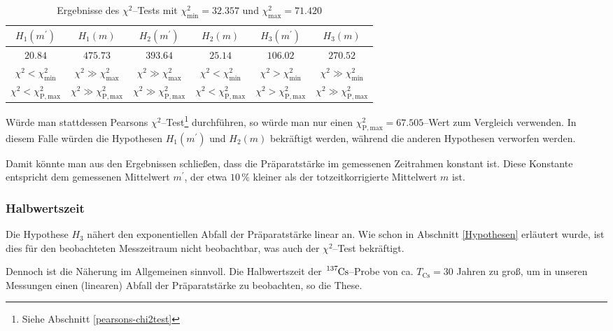 \documentclass[12pt,a4paper]{scrartcl}
\numberwithin{equation}{section} %
\renewcommand{\[}{} %
\renewcommand{\]}{\noindent} %
\begin{document}
\begin{table}[h]
	\centering
	\begin{tabular}{c|c|c|c|c|c}
		$H_1(m^\prime)$
			& $H_1(m)$
			& $H_2(m^\prime)$
			& $H_2(m)$
			& $H_3(m^\prime)$
			& $H_3(m)$
			\\
		\hline
		$20.84$
			& $475.73$
			& $393.64$
			& $25.14$
			& $106.02$
			& $270.52$
			\\
		$\chi^2 < \chi^2_\mathrm{min}$
			& $\chi^2 \gg \chi^2_\mathrm{max}$
			& $\chi^2 \gg \chi^2_\mathrm{max}$
			& $\chi^2 < \chi^2_\mathrm{min}$
			& $\chi^2 > \chi^2_\mathrm{min}$
			& $\chi^2 \gg \chi^2_\mathrm{min}$
			\\
		$\chi^2 < \chi_\mathrm{P, max}^2$
			& $\chi^2 \gg \chi_\mathrm{P, max}^2$
			& $\chi^2 \gg \chi_\mathrm{P, max}^2$
			& $\chi^2 < \chi_\mathrm{P, max}^2$
			& $\chi^2 > \chi_\mathrm{P, max}^2$
			& $\chi^2 \gg \chi_\mathrm{P, max}^2$
	\end{tabular}
	\caption{Ergebnisse des $\chi^2$--Tests mit $\chi^2_\mathrm{min} = 32.357$ und $\chi^2_\mathrm{max} = 71.420$ \cite{Kapur}}
	\label{tab:ChiSquared}
\end{table}

\noindent
Würde man stattdessen Pearsons $\chi^2$--Test\footnote{Siehe Abschnitt \ref{pearsons-chi2test}} durchführen, so würde man nur einen $\chi_\mathrm{P, max}^2 = 67.505$--Wert zum Vergleich verwenden. \cite{Kapur} In diesem Falle würden die Hypothesen $H_1(m^\prime)$ und $H_2(m)$ bekräftigt werden, während die anderen Hypothesen verworfen werden.

Damit könnte man aus den Ergebnissen schließen, dass die Präparatstärke im gemessenen Zeitrahmen konstant ist. Diese Konstante entspricht dem gemessenen Mittelwert $m^\prime$, der etwa $10\,\%$ kleiner als der totzeitkorrigierte Mittelwert $m$ ist.

\hypertarget{totzeit}{\subsubsection{Halbwertszeit}\label{totzeit}}
Die Hypothese $H_3$ nähert den exponentiellen Abfall der Präparatstärke linear an. Wie schon in Abschnitt \ref{Hypothesen} erläutert wurde, ist dies für den beobachteten Messzeitraum nicht beobachtbar, was auch der $\chi^2$--Test bekräftigt.

Dennoch ist die Näherung im Allgemeinen sinnvoll. Die Halbwertszeit der $\ce{^{137}Cs}$--Probe von ca. $T_\mathrm{Cs}=30$ Jahren \cite{Chart of Nuclides}  zu groß, um in unseren Messungen einen (linearen) Abfall der Präparatstärke zu beobachten, so die These.
\end{document}
